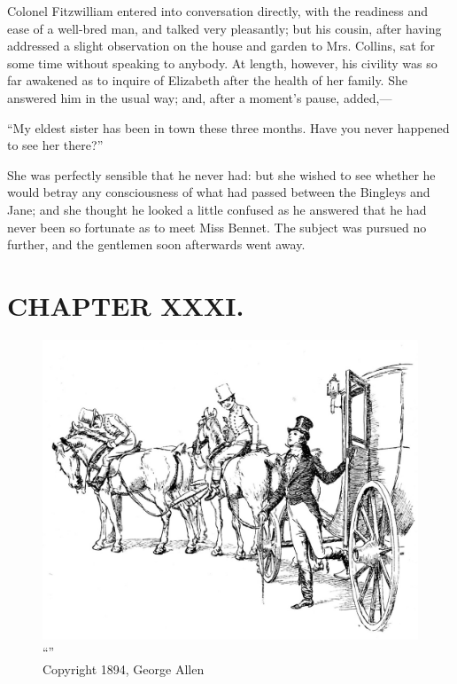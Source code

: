 Colonel Fitzwilliam entered into conversation directly, with the readiness and ease of a well-bred man, and talked very pleasantly; but his cousin, after having addressed a slight observation on the house and garden to Mrs. Collins, sat for some time without speaking to anybody. At length, however, his civility was so far awakened as to inquire of Elizabeth after the health of her family. She answered him in the usual way; and, after a moment's pause, added,---

``My eldest sister has been in town these three months. Have you never happened to see her there?''

She was perfectly sensible that he never had: but she wished to see whether he would betray any consciousness of what had passed between the Bingleys and Jane; and she thought he looked a little confused as he answered that he had never been so fortunate as to meet Miss Bennet. The subject was pursued no further, and the gentlemen soon afterwards went away.



\chapter{CHAPTER XXXI.}

\begin{figure}[htbp]
    \centering
    \includegraphics[width=\textwidth]{illustrations/i_031.jpg}
    \caption{“”\\ Copyright 1894, George Allen}
    \label{fig:image}
\end{figure}



